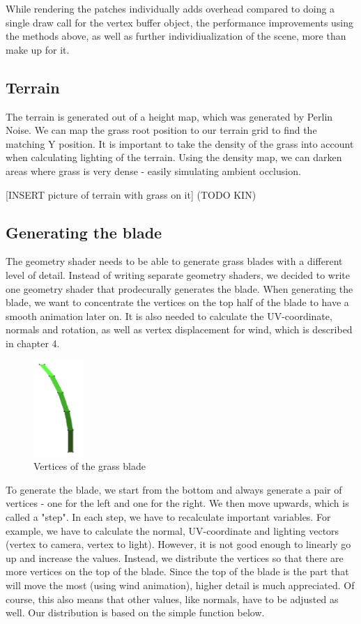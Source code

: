 \documentclass[conference]{acmsiggraph}
\begin{document}
While rendering the patches individually adds overhead compared to doing a single draw call for the vertex buffer object, the performance improvements using the methods above, as well as further individiualization of the scene, more than make up for it.

\subsection{Terrain}
The terrain is generated out of a height map, which was generated by Perlin Noise. We can map the grass root position to our terrain grid to find the matching Y position. It is important to take the density of the grass into account when calculating lighting of the terrain. Using the density map, we can darken areas where grass is very dense - easily simulating ambient occlusion.

[INSERT picture of terrain with grass on it] (TODO KIN)

\subsection{Generating the blade}
The geometry shader needs to be able to generate grass blades with a different level of detail. Instead of writing separate geometry shaders, we decided to write one geometry shader that prodecurally generates the blade. When generating the blade, we want to concentrate the vertices on the top half of the blade to have a smooth animation later on. It is also needed to calculate the UV-coordinate, normals and rotation, as well as vertex displacement for wind, which is described in chapter 4.

 \begin{figure}[ht]
   \centering
   \includegraphics[width=0.75in]{images/grass_blade_vertices}
   \caption{Vertices of the grass blade}
 \end{figure}

To generate the blade, we start from the bottom and always generate a pair of vertices - one for the left and one for the right. We then move upwards, which is called a "step". In each step, we have to recalculate important variables. For example, we have to calculate the normal, UV-coordinate and lighting vectors (vertex to camera, vertex to light). However, it is not good enough to linearly go up and increase the values. Instead, we distribute the vertices so that there are more vertices on the top of the blade. Since the top of the blade is the part that will move the most (using wind animation), higher detail is much appreciated. Of course, this also means that other values, like normals, have to be adjusted as well. Our distribution is based on the simple function below.
\end{document}
